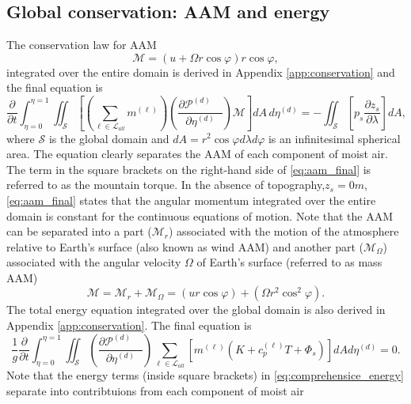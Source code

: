 \documentclass{agujournal}
\begin{document}
{\subsection{Global conservation: AAM and energy}\label{sec:aam}
The conservation law for AAM
\begin{equation}
\mathcal{M}=\left( u+\Omega r \cos \varphi \right) r \cos \varphi,
\end{equation}
integrated over the entire domain is derived in Appendix \ref{app:conservation} and the final equation is
\begin{equation}
\frac{\partial}{\partial t}\int_{\eta=0}^{\eta=1}\iint_{\mathcal{S}}\left[ \left( \sum_{\ell \in \mathcal{L}_{all}} m^{(\ell)}\right) \left( \frac{\partial \mathcal{P}^{(d)}\quad }{\partial \eta^{(d)}} \right) \mathcal{M} \right] dA\, d\eta^{(d)}=-\iint_{\mathcal{S}}\left[ p_s \frac{\partial z_s}{\partial \lambda}\right] dA,\label{eq:aam_final}
\end{equation}
where $\mathcal{S}$ is the global domain and $dA=r^2\cos\varphi d\lambda d\varphi$ is an infinitesimal spherical area. The equation clearly separates the AAM of each component of moist air. The term in the square brackets on the right-hand side of \eqref{eq:aam_final} is referred to as the mountain torque. In the absence of topography,$z_s=0m$, \eqref{eq:aam_final} states that the angular momentum integrated over the entire domain is constant for the continuous equations of motion. Note that the AAM can be separated into a part ($\mathcal{M}_r$) associated with the motion of the atmosphere relative to Earth's surface (also known as wind AAM) and another part ($\mathcal{M}_{\Omega}$) associated with the angular velocity $\Omega$ of Earth's surface (referred to as mass AAM)
\begin{equation}
\mathcal{M}=\mathcal{M}_r+\mathcal{M}_\Omega=\left( u r \cos \varphi\right)+\left(\Omega r^2 \cos^2 \varphi \right) .
\end{equation}
The total energy equation integrated over the global domain is also derived in Appendix \ref{app:conservation}. The final equation is
\begin{equation}
\frac{1}{g}\frac{\partial }{\partial t}\int_{\eta=0}^{\eta=1} \iint_\mathcal{S} \left( \frac{\partial \mathcal{P}^{(d)}\quad }{\partial \eta^{(d)}} \right)\sum_{\ell \in \mathcal{L}_{all}} \left[m^{(\ell)} \left(K+c_p^{(\ell)}T+\Phi_s  \right)\right]  dA d \eta^{(d)}=0.\label{eq:comprehensice_energy}
\end{equation}
Note that the energy terms (inside square brackets) in \eqref{eq:comprehensice_energy} separate into contribtuions from each component of moist air
}
\end{document}
